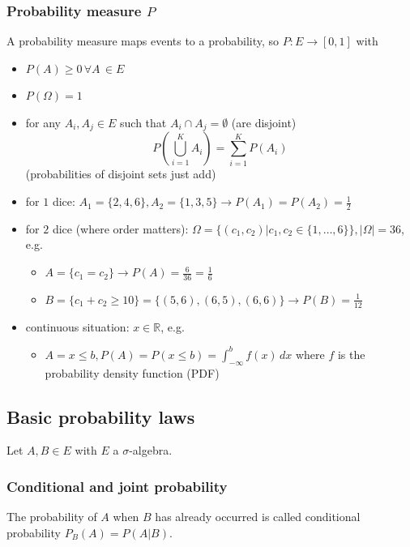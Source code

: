 \subsubsection{Probability measure $P$}
A probability measure maps events to a probability, so $P:E\rightarrow [0,1]$ with
\begin{itemize}
    \item $P(A) \geq 0 \, \forall A \, \in E$
    \item $P(\Omega) = 1$
    \item for any $A_i,A_j \in E$ such that $A_i \cap A_j = \emptyset$ (are disjoint)
    \begin{equation}
        P\left(\bigcup_{i=1}^K A_i\right)=\sum_{i=1}^K P\left(A_i\right)
    \end{equation}
    (probabilities of disjoint sets just add)
\end{itemize}
\begin{itemize}
    \item for $1$ dice: $A_1 = \{2,4,6\}, A_2 = \{ 1, 3, 5 \} \rightarrow P(A_1) = P(A_2) = \frac{1}{2}$
    \item for $2$ dice (where order matters): $\Omega = \{(c_1,c_2)|c_1,c_2 \in \{1,\dots,6\}\}, |\Omega| = 36$, e.g.
    \begin{itemize}
        \item $A = \{c_1 = c_2\} \rightarrow P(A) = \frac{6}{36} = \frac{1}{6}$
        \item $B = \{c_1+c_2 \geq 10\} = \{(5,6),(6,5),(6,6) \} \rightarrow P(B) = \frac{1}{12}$
    \end{itemize}
    \item continuous situation: $x \in \mathbb{R}$, e.g.
    \begin{itemize}
        \item $A={x\leq b}, P(A) = P(x\leq b) = \int_{-\infty}^{b} f(x) \, dx$ where $f$ is the probability density function (PDF)
    \end{itemize}
\end{itemize}

\subsection{Basic probability laws}
Let $A,B \in E$ with $E$ a $\sigma$-algebra.
\subsubsection{Conditional and joint probability}
The probability of $A$ when $B$ has already occurred is called
conditional probability $P_B(A) = P(A|B)$.

